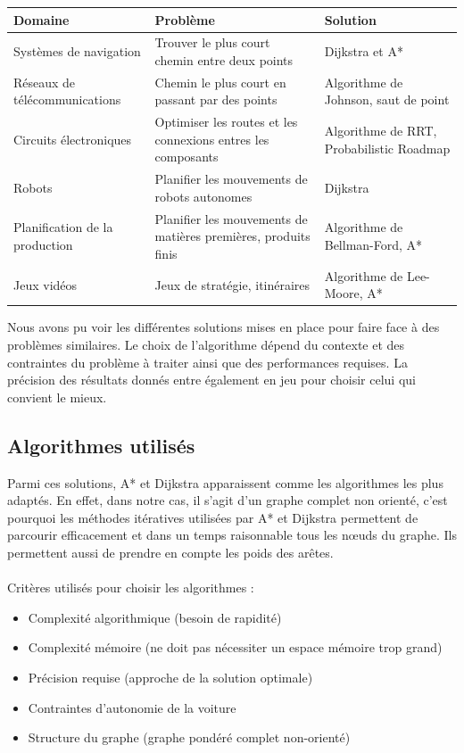 \documentclass[12pt,titlepage]{report}
\begin{document}
\begin{center}
\begin{tabular}{|p{4cm}|p{8cm}|p{3cm}|}
\hline
\textbf{Domaine} & \textbf{Problème} & \textbf{Solution} \\ \hline
Systèmes de navigation & Trouver le plus court chemin entre deux points & Dijkstra et A* \\ \hline
Réseaux de télécommunications & Chemin le plus court en passant par des points & Algorithme de Johnson, saut de point \\ \hline
Circuits électroniques & Optimiser les routes et les connexions entres les composants & Algorithme de RRT, Probabilistic Roadmap \\ \hline
Robots & Planifier les mouvements de robots autonomes & Dijkstra \\ \hline
Planification de la production & Planifier les mouvements de matières premières, produits finis & Algorithme de Bellman-Ford, A* \\ \hline
Jeux vidéos & Jeux de stratégie, itinéraires & Algorithme de Lee-Moore, A* \\ \hline
\end{tabular}
\end{center}

Nous avons pu voir les différentes solutions mises en place pour faire face à des problèmes similaires. Le choix de l’algorithme dépend du contexte et des contraintes du problème à traiter ainsi que des performances requises. La précision des résultats donnés entre également en jeu pour choisir celui qui convient le mieux.

\subsection{Algorithmes utilisés}
Parmi ces solutions, A* et Dijkstra apparaissent comme les algorithmes les plus adaptés. En effet, dans notre cas, il s’agit d’un graphe complet non orienté, c’est pourquoi les méthodes itératives utilisées par A* et Dijkstra permettent de parcourir efficacement et dans un temps raisonnable tous les nœuds du graphe. Ils permettent aussi de prendre en compte les poids des arêtes.\\
\\
Critères utilisés pour choisir les algorithmes :
\begin{itemize}
\item Complexité algorithmique (besoin de rapidité)
\item Complexité mémoire (ne doit pas nécessiter un espace mémoire trop grand)
\item Précision requise (approche de la solution optimale)
\item Contraintes d’autonomie de la voiture
\item Structure du graphe (graphe pondéré complet non-orienté)
\end{itemize}
\end{document}
